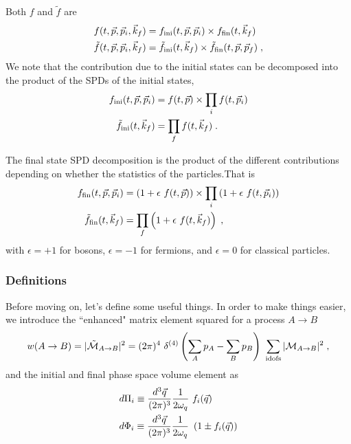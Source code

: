 \documentclass[11pt,a4paper]{article}
\begin{document}
Both $f$ and $\tilde{f}$ are
%
\begin{align*}
	&f(t,\vec{p}, \vec{p}_i , \vec{k}_f) = f_{\rm ini}(t,\vec{p}, \vec{p}_i) \times f_{\rm fin}(t, \vec{k}_f)  \\
	&\tilde f(t,\vec{p}, \vec{p}_i , \vec{k}_f) = \tilde f_{\rm ini}(t, \vec{k}_f) \times \tilde f_{\rm fin}(t,\vec{p}, \vec{p}_f) \;,
\end{align*}
%
We note that the contribution due to the initial states can be decomposed into the product of the SPDs of the initial states, \ie
%
\begin{align*}
f_{\rm ini}(t, \vec{p},\vec{p}_i) &= f(t, \vec{p}) \times \prod_{i} f(t, \vec{p}_i)  \\
\tilde f_{\rm ini}(t, \vec{k}_f) &= \prod_{f} f(t, \vec{k}_f) \;.
\end{align*}


The final state SPD decomposition is the product of the different contributions depending on whether the statistics of the particles.That is
%
\begin{align*}
	f_{\rm fin}(t, \vec{p},\vec{p}_i) &= \left(  1 +  \epsilon \   f(t, \vec{p})  \right) \times \prod_{i} \left(  1 +  \epsilon \  f(t, \vec{p}_i)  \right) \\
	\tilde f_{\rm fin}(t, \vec{k}_f) &= \prod_{f} \left(  1 +  \epsilon \ f(t, \vec{k}_f)  \right) \;,
\end{align*}
%
with $\epsilon = +1$ for bosons, $\epsilon = -1$ for fermions, and $\epsilon = 0$ for classical particles. 


\subsubsection*{Definitions}

Before moving on, let's define some useful things.  In order to make things easier, we introduce the ``enhanced" matrix element squared for a 
process $A \to B$ 
%
\begin{equation}
	w(A \to B) = |\tilde{ \mathcal{M} }_{A \to B}|^2 = (2\pi)^4 \ \delta^{(4)}\left( \sum_A p_A - \sum_B p_B \right)  \  \sum_{\rm idofs}|\mathcal{M}_{A \to B}|^2 \; ,
	\label{eq:tildeM}
\end{equation}
%
and the initial and final phase space volume element as 
%
\begin{eqnarray}
	&d \Pi_i  \equiv \dfrac{d^3 \vec{q}}{ (2 \pi)^3 } \dfrac{1}{2\omega_q} \ f_{i}(\vec{q}) \nonumber \\ 
	&d \Phi_i  \equiv \dfrac{d^3 \vec{q} }{ (2 \pi)^3 } \dfrac{1}{2\omega_q} \ \left( 1 \pm f_{i}(\vec{q}) \right)
	\label{eq:PhaseSpaceVolume}
\end{eqnarray}
% 
\end{document}
